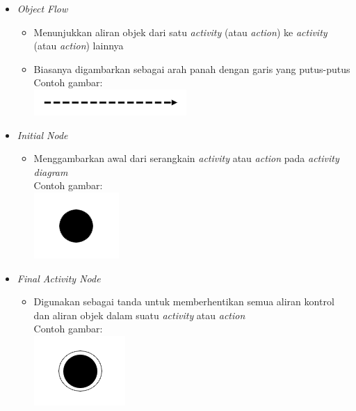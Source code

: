 \documentclass[a4paper]{article}
\begin{document}
\begin{enumerate}
\begin{itemize}
\begin{itemize}
        \end{itemize}
        \item \textit{Object Flow}
        \begin{itemize}
            \item Menunjukkan aliran objek dari satu \textit{activity} (atau \textit{action}) ke \textit{activity} (atau \textit{action}) lainnya
            \item Biasanya digambarkan sebagai arah panah dengan garis yang putus-putus\autocite{systemanalysisdesign-activity-diagram}\\
                  Contoh gambar:\\
                  \includegraphics[scale=0.5]{Object Flow_transparent.png}
        \end{itemize}
        \newpage
        \item \textit{Initial Node}
        \begin{itemize}
            \item Menggambarkan awal dari serangkain \textit{activity} atau \textit{action} pada \textit{activity diagram}\autocite{systemanalysisdesign-activity-diagram}\\
                  Contoh gambar:\\
                  \includegraphics[scale=0.45]{Initial Node_transparent.png}
        \end{itemize}
        \item \textit{Final Activity Node}
        \begin{itemize}
            \item Digunakan sebagai tanda untuk memberhentikan semua aliran kontrol dan aliran objek dalam suatu \textit{activity} atau \textit{action}\autocite{systemanalysisdesign-activity-diagram}\\
                  Contoh gambar:\\
                  \includegraphics[scale=0.45]{Final Activity Node_transparent.png}

\end{itemize}
\end{itemize}
\end{enumerate}
\end{document}
